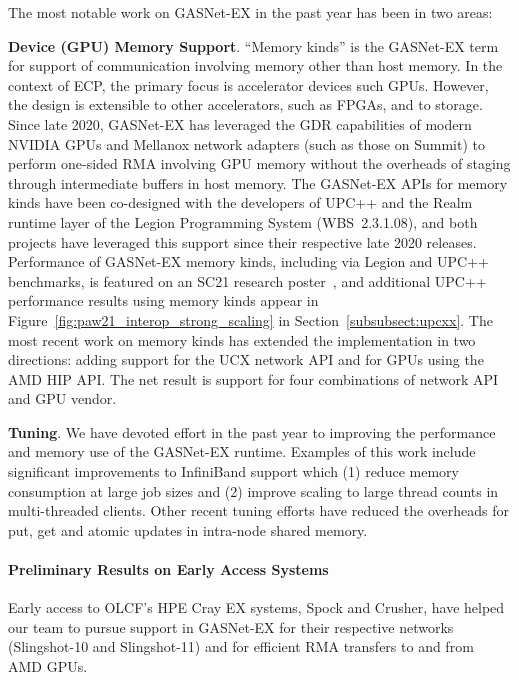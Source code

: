 The most notable work on GASNet-EX in the past year has been in two areas:

\textbf{Device (GPU) Memory Support}.
``Memory kinds'' is the GASNet-EX term for support of communication involving
memory other than host memory.  In the context of ECP, the primary focus is
accelerator devices such GPUs.  However, the design is extensible to other
accelerators, such as FPGAs, and to storage.
Since late 2020, GASNet-EX has leveraged the GDR
capabilities of modern NVIDIA GPUs and Mellanox network adapters (such as those
on Summit) to perform one-sided RMA involving GPU memory without
the overheads of staging through intermediate buffers in host memory.
The GASNet-EX APIs for memory kinds have been co-designed with the developers
of UPC++ and the Realm runtime layer of the Legion Programming System
(WBS~2.3.1.08), and both projects have leveraged this support since
their respective late 2020 releases.
Performance of GASNet-EX memory kinds, including via Legion and UPC++
benchmarks, is featured on an SC21 research poster~\cite{gasnet-poster-sc21},
and additional UPC++ performance results using memory kinds appear in
Figure~\ref{fig:paw21_interop_strong_scaling} in
Section~\ref{subsubsect:upcxx}.
The most recent work on memory kinds has extended the implementation in two directions:
adding support for the UCX network API and for GPUs using the AMD HIP API.
The net result is support for four combinations of network API and GPU vendor.

\textbf{Tuning}.
We have devoted effort in the past year to improving the performance and memory
use of the GASNet-EX runtime.  Examples of this work include significant
improvements to InfiniBand support which (1) reduce memory consumption at large
job sizes and (2) improve scaling to large thread counts in multi-threaded
clients.  Other recent tuning efforts have reduced the overheads for put, get
and atomic updates in intra-node shared memory.

\paragraph{Preliminary Results on Early Access Systems}

Early access to OLCF's HPE Cray EX systems, Spock and Crusher, have helped our
team to pursue support in GASNet-EX for their respective networks (Slingshot-10
and Slingshot-11) and for efficient RMA transfers to and from AMD GPUs.

